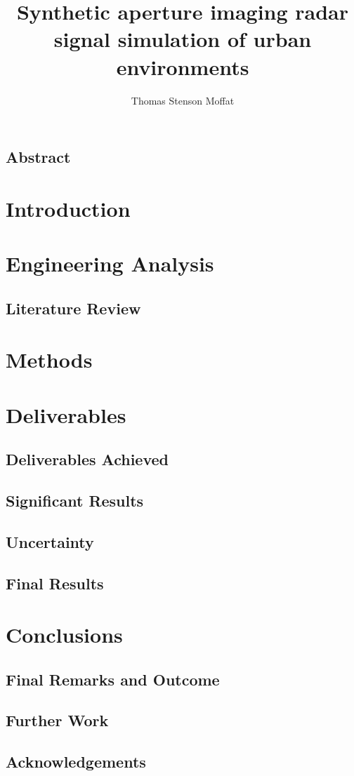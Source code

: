 \documentclass[11pt]{report}
\title{Synthetic aperture imaging radar signal simulation of urban environments}
\author{Thomas Stenson Moffat}
\begin{document}

\section*{Abstract}
\newpage
\tableofcontents
\listoffigures
\printglossary[type=symbols,style=long,title={List of Symbols}]
\chapter{Introduction}
\chapter{Engineering Analysis}

\section{Literature Review}


\chapter{Methods}

\chapter{Deliverables}
\section{Deliverables Achieved}
\section{Significant Results}
\section{Uncertainty}
\section{Final Results}
\chapter{Conclusions}
\section{Final Remarks and Outcome}
\section{Further Work}
\newpage
\section*{Acknowledgements}
\printbibliography


\end{document}
